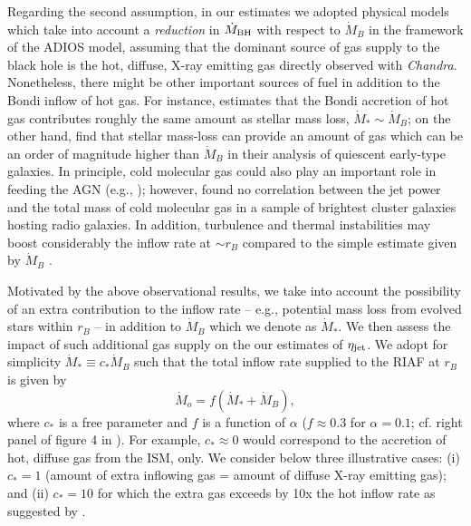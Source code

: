\documentclass[useAMS,usenatbib]{mn2e}
\begin{document}
Regarding the second assumption, in our estimates we adopted physical models which take into account a \emph{reduction} in $\dot{M}_{\rm BH}$ with respect to $\dot{M}_B$ in the framework of the ADIOS model, assuming that the dominant source of gas supply to the black hole is the hot, diffuse, X-ray emitting gas directly observed with \emph{Chandra}. 
Nonetheless, there might be other important sources of fuel in addition to the Bondi inflow of hot gas. For instance, \cite{Ho09} estimates that the Bondi accretion of hot gas contributes roughly the same amount as stellar mass loss, $\dot{M}_* \sim \dot{M}_B$; on the other hand, \cite{Soria06b} find that stellar mass-loss can provide an amount of gas which can be an order of magnitude higher than $\dot{M}_B$ in their analysis of quiescent early-type galaxies. In principle, cold molecular gas could also play an important role in feeding the AGN (e.g., \citealt{Salome03}); however, \cite{McNamara11} found no correlation between the jet power and the total mass of cold molecular gas in a sample of brightest cluster galaxies hosting radio galaxies. In addition, turbulence and thermal instabilities may boost considerably the inflow rate at $\sim r_B$ compared to the simple estimate given by $\dot{M}_B$ \citep{Krumholz06,Gaspari13}. 

Motivated by the above observational results, we take into account the possibility of an extra contribution to the inflow rate -- e.g., potential mass loss from evolved stars within $r_B$ --  in addition to $\dot{M}_B$ which we denote as $\dot{M}_*$. We then assess the impact of such additional gas supply on the our estimates of $\eta_{\rm jet}$. We adopt for simplicity $\dot{M}_* \equiv c_* \dot{M}_B$ such that the total inflow rate supplied to the RIAF at $r_B$ is given by
\begin{equation}
\dot{M}_o=f (\dot{M}_*+\dot{M}_B),
\end{equation}
where $c_*$ is a free parameter and $f$ is a function of $\alpha$ ($f \approx 0.3$ for $\alpha=0.1$; cf. right panel of figure 4 in \citealt{Narayan11}). For example, $c_* \approx 0$ would correspond to the accretion of hot, diffuse gas from the ISM, only. We consider below three illustrative cases: (i) $c_*=1$ (amount of extra inflowing gas = amount of diffuse X-ray emitting gas); and (ii) $c_*=10$ for which the extra gas exceeds by 10x the hot inflow rate as suggested by \cite{Soria06b}.
\end{document}

